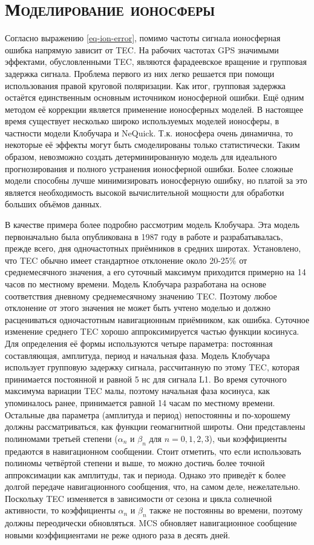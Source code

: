 \section{\textsc{Моделирование ионосферы}}

Согласно выражению \eqref{eq-ion-error}, помимо частоты сигнала ионосферная ошибка напрямую зависит от TEC.
На рабочих частотах GPS значимыми эффектами, обусловленными TEC, являются фарадеевское вращение и групповая задержка сигнала.
Проблема первого из них легко решается при помощи использования правой круговой поляризации.
Как итог, групповая задержка остаётся единственным основным источником ионосферной ошибки.
Ещё одним методом её коррекции является применение ионосферных моделей. 
В настоящее время существует несколько широко используемых моделей ионосферы, в частности модели Клобучара и NeQuick. 
Т.к. ионосфера очень динамична, то некоторые её эффекты могут быть смоделированы только статистически.
Таким образом, невозможно создать детерминированную модель для идеального прогнозирования и полного устранения ионосферной ошибки.
Более сложные модели способны лучше минимизировать ионосферную ошибку, но платой за это является необходимость высокой вычислительной мощности для обработки больших объёмов данных.

В качестве примера более подробно рассмотрим модель Клобучара.
Эта модель первоначально была опубликована в 1987 году в работе \cite{Klobuchar1987} и разрабатывалась, прежде всего, дня одночастотных приёмников в средних широтах.
Установлено, что TEC обычно имеет стандартное отклонение около 20-25\% от среднемесячного значения, а его суточный максимум приходится примерно на 14 часов по местному времени.
Модель Клобучара разработана на основе соответствия дневному среднемесячному значению TEC.
Поэтому любое отклонение от этого значения не может быть учтено моделью и должно расцениваться одночастотным навигационным приёмником, как ошибка.
Суточное изменение среднего TEC хорошо аппроксимируется частью функции косинуса.
Для определения её формы используются четыре параметра: постоянная составляющая, амплитуда, период и начальная фаза.
Модель Клобучара использует групповую задержку сигнала, рассчитанную по этому TEC, которая принимается постоянной и равной 5 нс для сигнала L1.
Во время суточного максимума вариации TEC малы, поэтому начальная фаза косинуса, как упоминалось ранее, принимается равной 14 часам по местному времени.
Остальные два параметра (амплитуда и период) непостоянны и по-хорошему должны рассматриваться, как функции геомагнитной широты.
Они представлены полиномами третьей степени ($\alpha_n$ и $\beta_n$ для $n=0,1,2,3$), чьи коэффициенты предаются в навигационном сообщении.
Стоит отметить, что если использовать полиномы четвёртой степени и выше, то можно достичь более точной аппроксимации как амплитуды, так и периода.
Однако это приведёт к более долгой передаче навигационного сообщения, что, на самом деле, нежелательно.
Поскольку TEC изменяется в зависимости от сезона и цикла солнечной активности, то коэффициенты $\alpha_n$ и $\beta_n$ также не постоянны во времени, поэтому должны переодически обновляться.
MCS обновляет навигационное сообщение новыми коэффициентами не реже одного раза в десять дней.

